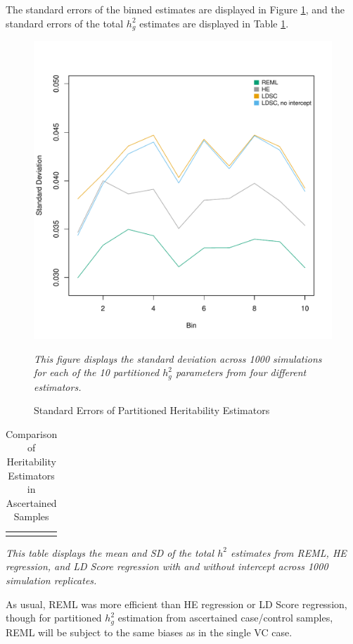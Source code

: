 The standard errors of the binned estimates are displayed in Figure \ref{Fig:MV},
and the standard errors of the total $h^2_g$ estimates are displayed in Table \ref{Table:mv}.

\begin{figure}[!ht]

\begin{centering}
\caption{Standard Errors of Partitioned Heritability Estimators}
    \includegraphics[scale=0.6]{figs/mv.pdf}
         \label{Fig:MV}
         
\small{\textit{This figure displays the standard deviation across 1000 simulations for each of the 10 partitioned $h^2_g$ parameters
from four different estimators.}}
\end{centering}
\end{figure}
\begin{table}[ht]
\centering
\caption{Comparison of Heritability Estimators in Ascertained Samples}
\label{Table:h2hat vs K}
\begin{tabular}{rllll}
\hline
\label{Table:mv}
\end{tabular}

\small{\textit{This table displays the mean and SD of the total $h^2$ estimates from REML, HE regression, and
LD Score regression with and without intercept across 1000 simulation replicates.}}
\end{table}
As usual, REML was more efficient than HE regression or LD Score regression, though 
for partitioned $h^2_g$ estimation from ascertained case/control samples, 
REML will be subject to the same biases as in the single VC case.

